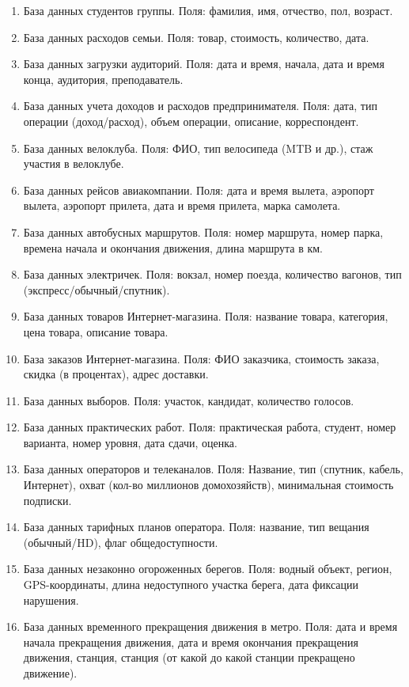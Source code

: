 \documentclass{article}
\begin{document}
\begin{enumerate}
	\item База данных студентов группы. Поля: фамилия, имя, отчество, пол, возраст. 
	\item База данных расходов семьи. Поля: товар, стоимость, количество, дата.
	\item База данных загрузки аудиторий. Поля: дата и время, начала, дата и время конца, аудитория, преподаватель. 
	\item База данных учета доходов и расходов предпринимателя. Поля: дата, тип операции (доход/расход), объем операции, описание, 
корреспондент. 
	\item База данных велоклуба. Поля: ФИО, тип велосипеда (MTB и др.), стаж участия в велоклубе.
	\item База данных рейсов авиакомпании. Поля: дата и время вылета, аэропорт вылета, аэропорт прилета, дата и время прилета, 
марка самолета.
	\item База данных автобусных маршрутов. Поля: номер маршрута, номер парка, времена начала и окончания движения,
длина маршрута в км. 
	\item База данных электричек. Поля: вокзал, номер поезда, количество вагонов, тип (экспресс/обычный/спутник).
	\item База данных товаров Интернет-магазина. Поля: название товара, категория, цена товара, описание товара. 
	\item База заказов Интернет-магазина. Поля: ФИО заказчика, стоимость заказа, скидка (в процентах), адрес доставки. 
	\item База данных выборов. Поля: участок, кандидат, количество голосов.
	\item База данных практических работ. Поля: практическая работа, студент, номер варианта, номер уровня, 
дата сдачи, оценка. 
	\item База данных операторов и телеканалов. Поля: Название, тип (спутник, кабель, Интернет), охват (кол-во миллионов домохозяйств), минимальная
стоимость подписки. 
	\item База данных тарифных планов оператора. Поля: название, тип вещания (обычный/HD), флаг общедоступности. 
	\item База данных незаконно огороженных берегов. Поля: водный объект, регион, GPS-координаты, длина недоступного участка берега, дата фиксации нарушения.
	\item База данных временного прекращения движения в метро. Поля: дата и время начала прекращения
движения, дата и время окончания прекращения движения, станция, станция (от какой до какой станции прекращено движение).

\end{enumerate}
\end{document}
